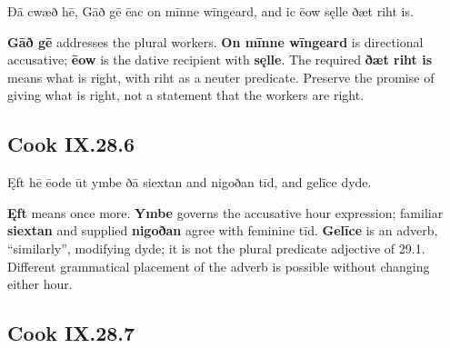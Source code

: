 \par\begin{minipage}{\linewidth}\raggedright
Ðā cwæð hē, Gāð gē ēac on mīnne wīngeard, and ic ēow sęlle ðæt riht is.

\textbf{Gāð gē} addresses the plural workers. \textbf{On mīnne wīngeard} is directional accusative; \textbf{ēow} is the dative recipient with \textbf{sęlle}. The required \textbf{ðæt riht is} means what is right, with riht as a neuter predicate. Preserve the promise of giving what is right, not a statement that the workers are right.

\end{minipage}\par\addvspace{4pt}

\subsection*{Cook IX.28.6}

\par\begin{minipage}{\linewidth}\raggedright
Ęft hē ēode ūt ymbe ðā siextan and nigoðan tīd, and gelīce dyde.

\textbf{Ęft} means once more. \textbf{Ymbe} governs the accusative hour expression; familiar \textbf{siextan} and supplied \textbf{nigoðan} agree with feminine tīd. \textbf{Gelīce} is an adverb, “similarly”, modifying dyde; it is not the plural predicate adjective of 29.1. Different grammatical placement of the adverb is possible without changing either hour.

\end{minipage}\par\addvspace{4pt}

\subsection*{Cook IX.28.7}

